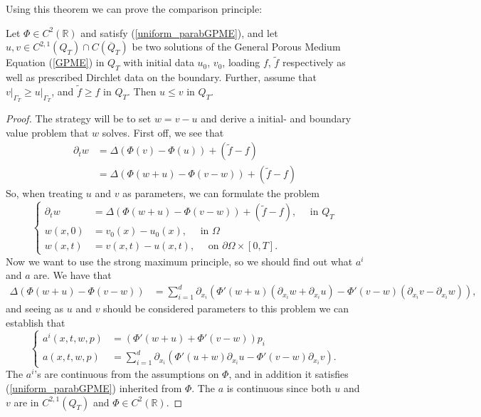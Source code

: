 \documentclass[11pt, a4paper]{article}
\begin{document}
Using this theorem we can prove the comparison principle:
\begin{lemma}
\label{lemma:comparison}
Let $\Phi \in C^2(\mathbb{R})$ and satisfy (\ref{uniform_parabGPME}), and let $u,v \in C^{2,1}(Q_T)\cap C(\overline{Q}_T)$ be two solutions of the General Porous Medium Equation (\ref{GPME}) in $Q_T$ with initial data $u_0$, $v_0$, loading $f$, $\tilde{f}$ respectively as well as prescribed Dirchlet data on the boundary. Further, assume that $v\big|_{\Gamma_T} \geq u\big|_{\Gamma_T}$, and  $\tilde{f} \geq f$ in $Q_T$. Then $u \leq v$ in $Q_T$.
\end{lemma}
\begin{proof}
The strategy will be to set $w = v-u$ and derive a initial- and boundary value problem that  $w$ solves. First off, we see that
\begin{align*}
\partial_t w &= \Delta(\Phi(v) - \Phi(u)) + (\tilde{f}-f) \\
&= \Delta ( \Phi(w+u) - \Phi(v-w) ) + (\tilde{f}-f)
\end{align*}
So, when treating $u$ and $v$ as parameters, we can formulate the problem
\begin{equation}
\begin{cases}
\partial_t w &= \Delta ( \Phi(w+u) - \Phi(v-w) ) + (\tilde{f}-f), \quad \text{ in } Q_T \\
w(x,0) &= v_0(x) - u_0(x), \quad \text{ in } \Omega \\
w(x,t) &= v(x,t) - u(x,t), \quad \text{ on } \partial \Omega \times [0,T].
\end{cases}
\end{equation}
Now we want to use the strong maximum principle, so we should find out what $a^i$ and $a$ are. We have that
\begin{align*}
\Delta ( \Phi(w+u) - \Phi(v-w) )&= \sum_{i=1}^d \partial_{x_i}\left(\Phi'(w+u)(\partial_{x_i}w + \partial_{x_i}u) - \Phi'(v-w)(\partial_{x_i}v-\partial_{x_i}w) \right),
\end{align*} 
and seeing as $u$ and $v$ should be considered parameters to this problem we can establish that
\begin{equation*}
\begin{cases}
a^i(x,t,w,p) &= (\Phi'(w+u) + \Phi'(v-w))p_i \\
a(x,t,w,p) &= \sum_{i=1}^d \partial_{x_i}\left( \Phi'(u+w)\partial_{x_i}u - \Phi'(v-w)\partial_{x_i}v\right).
\end{cases}
\end{equation*}
The $a^i$'s are continuous from the assumptions on $\Phi$, and in addition it satisfies (\ref{uniform_parabGPME}) inherited from $\Phi$. The $a$ is continuous since both $u$ and $v$ are in $C^{2,1}(Q_T)$ and $\Phi \in C^2(\mathbb{R})$.


\end{proof}
\end{document}
